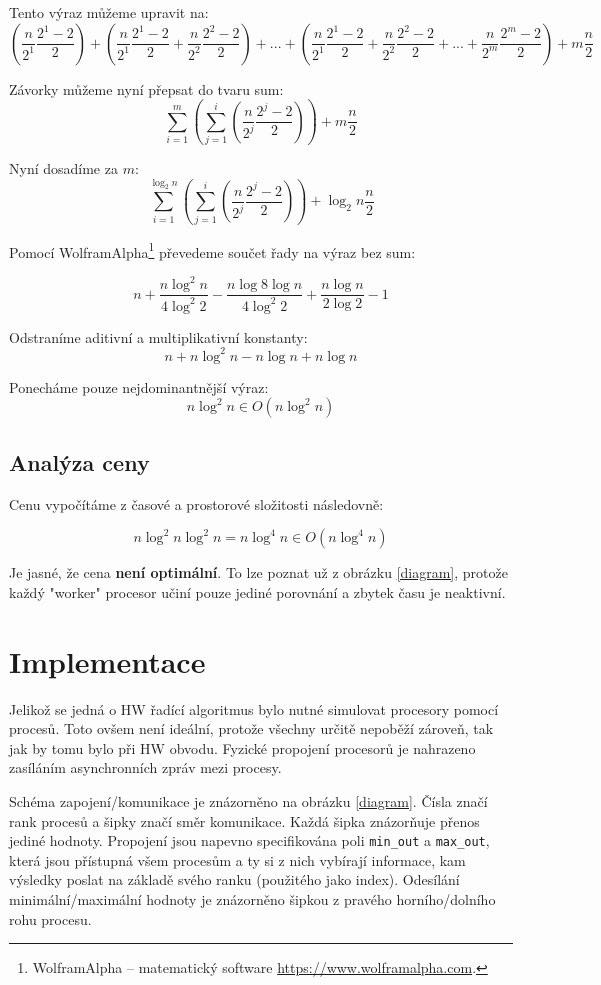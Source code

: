 \documentclass[12pt]{article}
\begin{document}
Tento výraz můžeme upravit na:
\[(\frac{n}{2^1}\frac{2^1 - 2}{2}) + 
  (\frac{n}{2^1}\frac{2^1 - 2}{2} + \frac{n}{2^2}\frac{2^2 - 2}{2}) +
   ... + 
  (\frac{n}{2^1}\frac{2^1 - 2}{2} + \frac{n}{2^2}\frac{2^2 - 2}{2} + ... + \frac{n}{2^m}\frac{2^m - 2}{2}) + m\frac{n}{2}\]

Závorky můžeme nyní přepsat do tvaru sum:
\[\sum\limits_{i=1}^m (\sum\limits_{j=1}^i (\frac{n}{2^j}\frac{2^j-2}{2}))+ m\frac{n}{2}\]

Nyní dosadíme za \(m\):
\[\sum\limits_{i=1}^{\log_2 n} (\sum\limits_{j=1}^i (\frac{n}{2^j}\frac{2^j-2}{2}))+ \log_2 n\frac{n}{2}\]

Pomocí WolframAlpha\footnote{WolframAlpha -- matematický software \href{https://www.wolframalpha.com}{https://www.wolframalpha.com}.} převedeme součet řady na výraz bez sum:

\[n + \frac{n \log^2 n}{4 \log^2 2} - \frac{n \log 8 \log n}{4 \log^2 2} + \frac{n \log n}{2 \log 2} - 1\]

Odstraníme aditivní a multiplikativní konstanty:
\[n + n \log^2 n - n\log n + n \log n\]

Ponecháme pouze nejdominantnější výraz:
\[n \log^2 n \in O(n \log^2 n) \] 

\subsection{Analýza ceny}
Cenu vypočítáme z časové a prostorové složitosti následovně:

\[n \log^2 n \log^2 n = n \log^4 n \in O(n \log^4 n)\]

Je jasné, že cena \textbf{není optimální}. To lze poznat už z obrázku \ref{diagram}, protože každý "worker" procesor učiní pouze jediné porovnání a zbytek času je neaktivní.

\section{Implementace}
Jelikož se jedná o HW řadící algoritmus bylo nutné simulovat procesory pomocí procesů. Toto ovšem není ideální, protože všechny určitě nepoběží zároveň, tak jak by tomu bylo při HW obvodu. Fyzické propojení procesorů je nahrazeno zasíláním asynchronních zpráv mezi procesy. 

Schéma zapojení/komunikace je znázorněno na obrázku \ref{diagram}. Čísla značí rank procesů a šipky značí směr komunikace. Každá šipka znázorňuje přenos jediné hodnoty. Propojení jsou napevno specifikována poli \texttt{min\_out} a \texttt{max\_out}, která jsou přístupná všem procesům a ty si z nich vybírají informace, kam výsledky poslat na základě svého ranku (použitého jako index). Odesílání minimální/maximální hodnoty je znázorněno šipkou z pravého horního/dolního rohu procesu.
\end{document}
